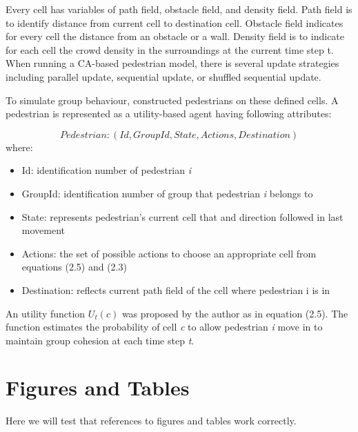 \documentclass[a4paper,11pt,phdthesis,singlespace,twoside]{cssethesis}
\begin{document}
Every cell has variables of path field, obstacle field, and density field. Path field is to identify distance from current cell to destination cell. Obstacle field indicates for every cell the distance from an obstacle or a wall. Density field is to indicate for each cell the crowd density in the surroundings at the current time step t. When running a CA-based pedestrian model, there is several update strategies including parallel update, sequential update, or shuffled sequential update. 

To simulate group behaviour, \cite{Bandini:2011} constructed pedestrians on these defined cells. A pedestrian is represented as a utility-based agent having following attributes:

\begin{equation}
Pedestrian: (Id,GroupId,State,Actions,Destination)
\end{equation}
where:
\begin{itemize}
  \item Id: identification number of pedestrian \textit{i}
  \item GroupId: identification number of group that pedestrian \textit{i} belongs to
  \item State: represents pedestrian’s current cell that and direction followed in last movement
	\item Actions: the set of possible actions to choose an appropriate cell from equations (2.5) and (2.3)
	\item Destination: reflects current path field of the cell where pedestrian i is in
\end{itemize}

An utility function \begin{math}U_{t}(c)\end{math}  was proposed by the author as in equation (2.5). The function estimates the probability of cell \textit{c} to allow pedestrian \textit{i} move in to maintain group cohesion at each time step \textit{t}.

\chapter{Figures and Tables}
Here we will test that references to figures and tables work correctly.
\end{document}
